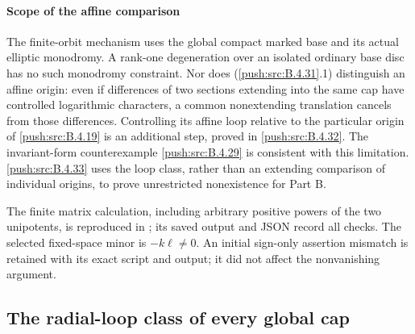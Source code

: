 \paragraph{Scope of the affine comparison}
The finite-orbit mechanism uses the global compact marked
base and its actual elliptic monodromy. A rank-one degeneration
over an isolated ordinary base disc has no such monodromy
constraint. Nor does (\ref{push:src:B.4.31}.1) distinguish an affine origin:
even if differences of two sections extending into the same
cap have controlled logarithmic characters, a common
nonextending translation cancels from those differences.
Controlling its affine loop relative to the particular
origin of \ref{push:src:B.4.19} is an additional step, proved in \ref{push:src:B.4.32}.
The invariant-form counterexample \ref{push:src:B.4.29} is consistent with
this limitation. \ref{push:src:B.4.33} uses the loop class, rather than
an extending comparison of individual origins, to prove
unrestricted nonexistence for Part B.




The finite matrix calculation, including arbitrary positive
powers of the two unipotents, is reproduced in
; its saved output and
JSON record all checks. The selected fixed-space minor is
$-k\ell\ne0$. An initial sign-only assertion mismatch is
retained with its exact script and output; it did not affect
the nonvanishing argument.

\subsection{The radial-loop class of every global cap}

